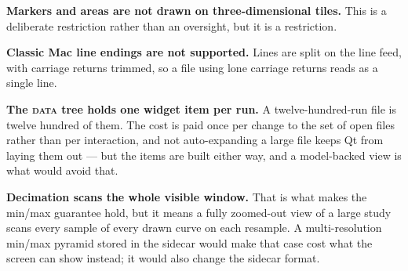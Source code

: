 \documentclass[11pt,a4paper,oneside]{report}
\newcommand{\tab}[1]{\textsc{#1}}
\begin{document}
\textbf{Markers and areas are not drawn on three-dimensional tiles.} This is a
deliberate restriction rather than an oversight, but it is a restriction.

\textbf{Classic Mac line endings are not supported.} Lines are split on the line
feed, with carriage returns trimmed, so a file using lone carriage returns reads
as a single line.

\textbf{The \tab{data} tree holds one widget item per run.} A twelve-hundred-run
file is twelve hundred of them. The cost is paid once per change to the set of
open files rather than per interaction, and not auto-expanding a large file
keeps Qt from laying them out --- but the items are built either way, and a
model-backed view is what would avoid that.

\textbf{Decimation scans the whole visible window.} That is what makes the
min/max guarantee hold, but it means a fully zoomed-out view of a large study
scans every sample of every drawn curve on each resample. A multi-resolution
min/max pyramid stored in the sidecar would make that case cost what the screen
can show instead; it would also change the sidecar format.
\end{document}
